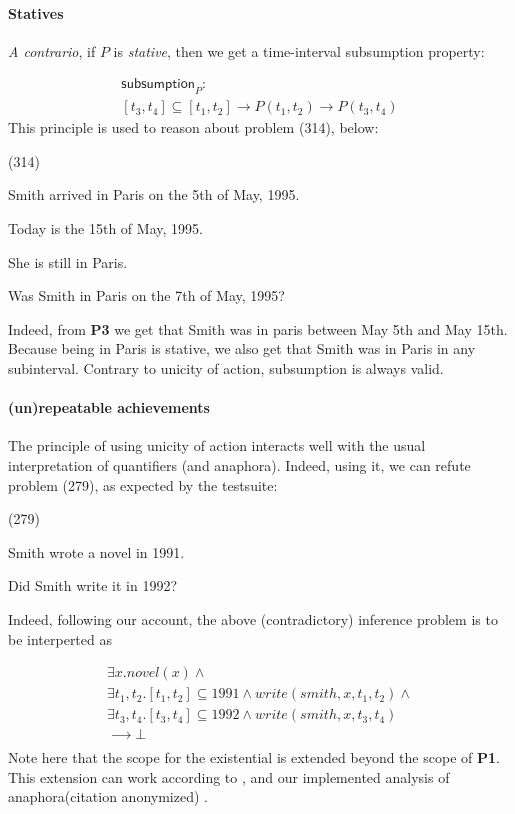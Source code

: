 \documentclass[a4paper,11pt]{article}
\newcommand\hyp{\item[H]}
\newcommand\fracasex[2]{\begin{lingex}\item[(#1)] \begin{subex} #2 \end{subex} \end{lingex} }
\newcommand\constant[1]{\mathsf{#1}}
\begin{document}
\paragraph{Statives}
\textit{A contrario}, if \(P\) is \emph{stative}, then we get a time-interval subsumption property:

\begin{multline*}
\constant {subsumption}_P :\\ [t_3,t_4] ⊆ [t_1,t_2] → P (t_1,t_2) → P (t_3,t_4)
\end{multline*}
This principle is used to reason about problem (314), below:

\fracasex{314}
{\item	Smith arrived in Paris on the 5th of May, 1995.
\item	Today is the 15th of May, 1995.
\item	She is still in Paris.
\hyp 	Was Smith in Paris on the 7th of May, 1995?
}

Indeed, from \textbf{P3} we get that Smith was in paris between May
5th and May 15th. Because being in Paris is stative, we also get that
Smith was in Paris in any subinterval. Contrary to unicity of action,
subsumption is always valid.


\paragraph{(un)repeatable achievements}
The principle of using unicity of action interacts well with the usual
interpretation of quantifiers (and anaphora).  Indeed, using it, we
can refute problem (279), as expected by the testsuite:

\fracasex{279}{
\item	Smith wrote a novel in 1991.
\hyp 	Did Smith write it in 1992?
}
Indeed, following our account, the above (contradictory) inference problem is to be
interperted as

\[\begin{array}{l}
∃x. novel(x) ∧ \\
∃t_1,t_2. [t_1,t_2] ⊆ 1991 ∧ write(smith,x,t_1,t_2) ∧ \\
∃t_3,t_4. [t_3,t_4] ⊆ 1992 ∧ write(smith,x,t_3,t_4) \\
⟶ ⊥ \\
\end{array}
\]
Note here that the scope for the existential is extended beyond the
scope of \textbf{P1}. This extension can work according to
\citet{unger:2011}, and our implemented analysis of anaphora\ifanon (citation anonymized) \else\citep{bernardy_computational_2018,bernardy_wide_2019}\fi.
\end{document}
